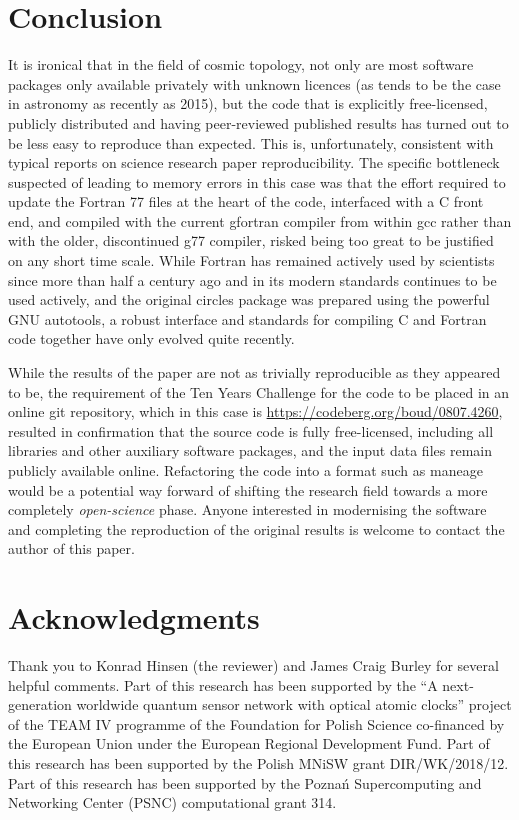 \section{Conclusion}

\fussy
It is ironical that in the field of cosmic topology, not only are most
software packages only available privately with unknown licences (as
tends to be the case in astronomy as recently as
2015\supercite{Allen18}), but the code that is explicitly
free-licensed, publicly distributed and having peer-reviewed published
results has turned out to be less easy to reproduce than
expected. This is, unfortunately, consistent with typical reports on
science research paper
reproducibility\supercite{Ioannidis2009,Chang15,Stodden18}.  The
specific bottleneck suspected of leading to memory errors in this case
was that the effort required to update the Fortran 77 files at the
heart of the code, interfaced with a C front end, and compiled with
the current {\sc gfortran} compiler from within {\sc gcc} rather than
with the older, discontinued\supercite{Burley01g77} {\sc g77}
compiler, risked being too great to be justified on any short time
scale. While Fortran has remained actively used by scientists since
more than half a century ago and in its modern standards continues to
be used actively, and the original {\sc circles} package was prepared
using the powerful GNU {\sc autotools}, a robust interface and
standards for compiling C and Fortran code together have only evolved
quite recently\supercite{GCCISOFortranC}.

While the results of the paper are not as trivially reproducible as
they appeared to be, the requirement of the Ten Years Challenge for
the code to be placed in an online git repository, which in this case
is \url{https://codeberg.org/boud/0807.4260}, resulted in confirmation
that the source code is fully free-licensed, including all libraries
and other auxiliary software packages, and the input data files remain
publicly available online. Refactoring the code into a format such as
{\sc maneage}\supercite{Akhlaghi15,Akhlaghi2020} would be a potential
way forward of shifting the research field towards a more
completely \emph{open-science} phase. Anyone interested in modernising
the software and completing the reproduction of the original results
is welcome to contact the author of this paper.

\section*{Acknowledgments}
{\footnotesize Thank you to Konrad Hinsen (the reviewer) and James
  Craig Burley for several helpful comments.
  Part of this research has been supported by the ``A
  next-generation worldwide quantum sensor network with optical atomic
  clocks'' project of the TEAM IV programme of the Foundation for
  Polish Science co-financed by the European Union under the European
  Regional Development Fund.  Part of this research has been supported
  by the Polish MNiSW grant DIR/WK/2018/12.  Part of this research has
  been supported by the Pozna\'n Supercomputing and Networking Center
  (PSNC) computational grant 314.}
